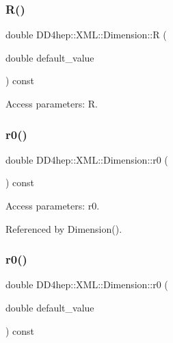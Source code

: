 \subsubsection{\texorpdfstring{R()}{R()}\hspace{0.1cm}{\footnotesize\ttfamily [2/2]}}
{\footnotesize\ttfamily double D\+D4hep\+::\+X\+M\+L\+::\+Dimension\+::R (\begin{DoxyParamCaption}\item[{double}]{default\+\_\+value }\end{DoxyParamCaption}) const}



Access parameters\+: R. 

\hypertarget{struct_d_d4hep_1_1_x_m_l_1_1_dimension_ae202dea16ed0bc4bb3c87a53c844ef88}{}\label{struct_d_d4hep_1_1_x_m_l_1_1_dimension_ae202dea16ed0bc4bb3c87a53c844ef88} 
\subsubsection{\texorpdfstring{r0()}{r0()}\hspace{0.1cm}{\footnotesize\ttfamily [1/2]}}
{\footnotesize\ttfamily double D\+D4hep\+::\+X\+M\+L\+::\+Dimension\+::r0 (\begin{DoxyParamCaption}{ }\end{DoxyParamCaption}) const}



Access parameters\+: r0. 



Referenced by Dimension().

\hypertarget{struct_d_d4hep_1_1_x_m_l_1_1_dimension_a44b89631c5a046ad28444a9ee577c765}{}\label{struct_d_d4hep_1_1_x_m_l_1_1_dimension_a44b89631c5a046ad28444a9ee577c765} 
\subsubsection{\texorpdfstring{r0()}{r0()}\hspace{0.1cm}{\footnotesize\ttfamily [2/2]}}
{\footnotesize\ttfamily double D\+D4hep\+::\+X\+M\+L\+::\+Dimension\+::r0 (\begin{DoxyParamCaption}\item[{double}]{default\+\_\+value }\end{DoxyParamCaption}) const}




